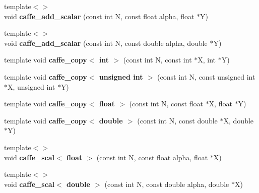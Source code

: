 \begin{DoxyCompactItemize}
\item 
{\footnotesize template$<$$>$ }\\void {\bfseries caffe\+\_\+add\+\_\+scalar} (const int N, const float alpha, float $\ast$Y)\hypertarget{namespacecaffe_a90978c3c773431b11c882e2a036bd2c2}{}\label{namespacecaffe_a90978c3c773431b11c882e2a036bd2c2}

\item 
{\footnotesize template$<$$>$ }\\void {\bfseries caffe\+\_\+add\+\_\+scalar} (const int N, const double alpha, double $\ast$Y)\hypertarget{namespacecaffe_a8894a527bd87ff85fd7f480ed4876917}{}\label{namespacecaffe_a8894a527bd87ff85fd7f480ed4876917}

\item 
template void {\bfseries caffe\+\_\+copy$<$ int $>$} (const int N, const int $\ast$X, int $\ast$Y)\hypertarget{namespacecaffe_a9d3755b4fb843b832985af9d137dfbc0}{}\label{namespacecaffe_a9d3755b4fb843b832985af9d137dfbc0}

\item 
template void {\bfseries caffe\+\_\+copy$<$ unsigned int $>$} (const int N, const unsigned int $\ast$X, unsigned int $\ast$Y)\hypertarget{namespacecaffe_a5669a2559e1a131157b3f7df02b71c25}{}\label{namespacecaffe_a5669a2559e1a131157b3f7df02b71c25}

\item 
template void {\bfseries caffe\+\_\+copy$<$ float $>$} (const int N, const float $\ast$X, float $\ast$Y)\hypertarget{namespacecaffe_ae1ee74a0d097c75a767085dc6a1a44be}{}\label{namespacecaffe_ae1ee74a0d097c75a767085dc6a1a44be}

\item 
template void {\bfseries caffe\+\_\+copy$<$ double $>$} (const int N, const double $\ast$X, double $\ast$Y)\hypertarget{namespacecaffe_a4009834e605f6a5b7e4fb47e50dbf10c}{}\label{namespacecaffe_a4009834e605f6a5b7e4fb47e50dbf10c}

\item 
{\footnotesize template$<$$>$ }\\void {\bfseries caffe\+\_\+scal$<$ float $>$} (const int N, const float alpha, float $\ast$X)\hypertarget{namespacecaffe_a53ccb0c1449e14351b86a919948d1a87}{}\label{namespacecaffe_a53ccb0c1449e14351b86a919948d1a87}

\item 
{\footnotesize template$<$$>$ }\\void {\bfseries caffe\+\_\+scal$<$ double $>$} (const int N, const double alpha, double $\ast$X)\hypertarget{namespacecaffe_a11cf505d7d4980d3d8b2eb84f76bc969}{}\label{namespacecaffe_a11cf505d7d4980d3d8b2eb84f76bc969}


\end{DoxyCompactItemize}
